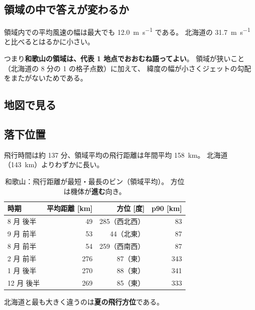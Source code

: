 \subsection{領域の中で答えが変わるか}



領域内での平均風速の幅は最大でも \SI{12.0}{\metre\per\second} である。
北海道の \SI{31.7}{\metre\per\second} と比べるとはるかに小さい。

つまり\textbf{和歌山の領域は、代表 1 地点でおおむね語ってよい}。
領域が狭いこと（北海道の 8 分の 1 の格子点数）に加えて、
緯度の幅が小さくジェットの勾配をまたがないためである。

\subsection{地図で見る}



\subsection{落下位置}



飛行時間は約 \num{137} 分、領域平均の飛行距離は年間平均 \SI{158}{\kilo\metre}。
北海道（\SI{143}{\kilo\metre}）よりわずかに長い。

\begin{table}[H]
\centering
\caption{和歌山：飛行距離が最短・最長のビン（領域平均）。
方位は機体が\textbf{進む}向き。}
\begin{tabular}{lrrr}
\toprule
時期 & 平均距離 [\si{\kilo\metre}] & 方位 [度] & p90 [\si{\kilo\metre}] \\
\midrule
8 月 後半 & 49 & 285（西北西） & 83 \\
9 月 前半 & 53 & 44（北東） & 87 \\
8 月 前半 & 54 & 259（西南西） & 87 \\
\midrule
2 月 前半 & 276 & 87（東） & 343 \\
1 月 後半 & 270 & 88（東） & 341 \\
12 月 後半 & 269 & 85（東） & 333 \\
\bottomrule
\end{tabular}
\end{table}

北海道と最も大きく違うのは\textbf{夏の飛行方位}である。

